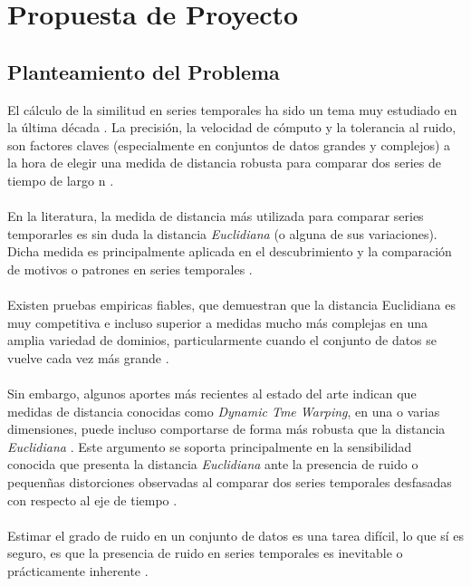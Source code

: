 \section{\textbf{Propuesta de Proyecto}}
\subsection{Planteamiento del Problema}
El c\'alculo de la similitud en series temporales ha sido un tema muy estudiado en la \'ultima d\'ecada \cite{rulediscovery}. La precisi\'on, la velocidad de c\'omputo y la tolerancia al ruido, son factores claves (especialmente en conjuntos de datos grandes y complejos) a la hora de elegir una medida de distancia robusta para comparar dos series de tiempo de largo n \cite{multidimensional}.\\\\
En la literatura, la medida de distancia m\'as utilizada para comparar series temporarles es sin duda la distancia \textit{Euclidiana} (o alguna de sus variaciones). Dicha medida es principalmente aplicada en el descubrimiento y la comparaci\'on de motivos o patrones en series temporales \cite{motifs}\cite{patterns}.\\\\
Existen pruebas empiricas fiables, que demuestran que la distancia Euclidiana es muy competitiva e incluso superior a medidas mucho m\'as complejas en una amplia variedad de dominios, particularmente cuando el conjunto de datos se vuelve cada vez m\'as grande \cite{distancecomparison}\cite{timewarpingindexing}.\\\\
Sin embargo, algunos aportes m\'as recientes al estado del arte indican que medidas de distancia conocidas como \textit{Dynamic Tme Warping}, en una o varias dimensiones, puede incluso comportarse de forma m\'as robusta que la distancia \textit{Euclidiana} \cite{keogh}. Este argumento se soporta principalmente en la sensibilidad conocida que presenta la distancia \textit{Euclidiana} ante la presencia de ruido o pequen\~nas distorciones observadas al comparar dos series temporales desfasadas con respecto al eje de tiempo \cite{DTWcubicsplineinterpolation}.\\\\
Estimar el grado de ruido en un conjunto de datos es una tarea dif\'icil, lo que s\'i es seguro, es que la presencia de ruido en series temporales es inevitable o pr\'acticamente inherente \cite{noise}.\\\\

